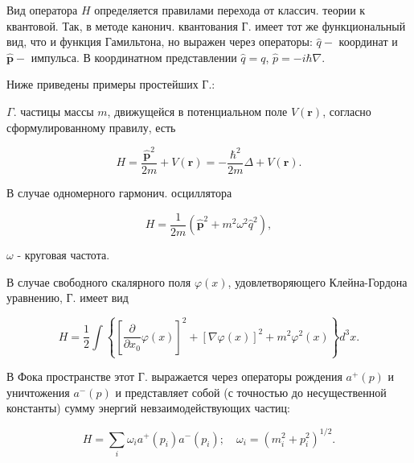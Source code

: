 \documentclass[10pt]{article}
\begin{document}
Вид оператора $H$ определяется правилами перехода от классич. теории к квантовой. Так, в методе канонич. квантования Г. имеет тот же функциональный вид, что и функция Гамильтона, но выражен через операторы: $\hat{q}-$ координат и $\hat{\boldsymbol{p}}-$ импульса. В координатном представлении $\hat{q}=q$, $\hat{p}=-i \hbar \nabla$.



Ниже приведены примеры простейших Г.:



$\Gamma$. частицы массы $m$, движущейся в потенциальном поле $V(\boldsymbol{r})$, согласно сформулированному правилу, есть



\[

H=\frac{\hat{\boldsymbol{p}}^{2}}{2 m}+V(\boldsymbol{r})=-\frac{\hbar^{2}}{2 m} \Delta+V(\boldsymbol{r}) .

\]



В случае одномерного гармонич. осциллятора



\[

H=\frac{1}{2 m}\left(\hat{\boldsymbol{p}}^{2}+m^{2} \omega^{2} \hat{q}^{2}\right),

\]



$\omega$ - круговая частота.



В случае свободного скалярного поля $\varphi(x)$, удовлетворяющего Клейна-Гордона уравнению, Г. имеет вид



\[

H=\frac{1}{2} \int\left\{\left[\frac{\partial}{\partial x_{0}} \varphi(x)\right]^{2}+[\nabla \varphi(x)]^{2}+m^{2} \varphi^{2}(x)\right\} d^{3} x .

\]



В Фока пространстве этот Г. выражается через операторы рождения $a^{+}(p)$ и уничтожения $a^{-}(p)$ и представляет собой (с точностью до несущественной константы) сумму энергий невзаимодействующих частиц:



\[

H=\sum_{i} \omega_{i} a^{+}\left(p_{i}\right) a^{-}\left(p_{i}\right) ; \quad \omega_{i}=\left(m_{i}^{2}+p_{i}^{2}\right)^{1 / 2} .

\]
\end{document}
